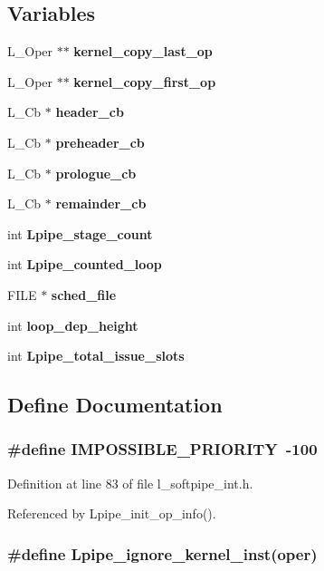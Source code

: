 \subsection*{Variables}
\begin{CompactItemize}
\item 
L\_\-Oper $\ast$$\ast$ \bf{kernel\_\-copy\_\-last\_\-op}
\item 
L\_\-Oper $\ast$$\ast$ \bf{kernel\_\-copy\_\-first\_\-op}
\item 
L\_\-Cb $\ast$ \bf{header\_\-cb}
\item 
L\_\-Cb $\ast$ \bf{preheader\_\-cb}
\item 
L\_\-Cb $\ast$ \bf{prologue\_\-cb}
\item 
L\_\-Cb $\ast$ \bf{remainder\_\-cb}
\item 
int \bf{Lpipe\_\-stage\_\-count}
\item 
int \bf{Lpipe\_\-counted\_\-loop}
\item 
FILE $\ast$ \bf{sched\_\-file}
\item 
int \bf{loop\_\-dep\_\-height}
\item 
int \bf{Lpipe\_\-total\_\-issue\_\-slots}
\end{CompactItemize}


\subsection{Define Documentation}
\subsubsection{\setlength{\rightskip}{0pt plus 5cm}\#define IMPOSSIBLE\_\-PRIORITY~-100}\label{l__softpipe__int_8h_aa6440f8a241a8b4b71f4ea4f0352793}




Definition at line 83 of file l\_\-softpipe\_\-int.h.

Referenced by Lpipe\_\-init\_\-op\_\-info().
\subsubsection{\setlength{\rightskip}{0pt plus 5cm}\#define Lpipe\_\-ignore\_\-kernel\_\-inst(oper)}\label{l__softpipe__int_8h_2b1a0c0947bed531533824d870c251b9}


